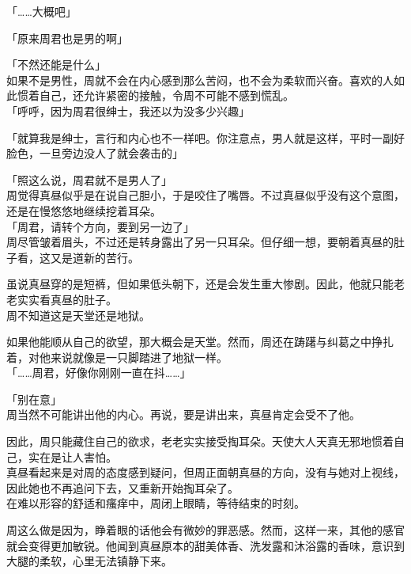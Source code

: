 「……大概吧」

「原来周君也是男的啊」

「不然还能是什么」\\

如果不是男性，周就不会在内心感到那么苦闷，也不会为柔软而兴奋。喜欢的人如此惯着自己，还允许紧密的接触，令周不可能不感到慌乱。\\

「呼呼，因为周君很绅士，我还以为没多少兴趣」

「就算我是绅士，言行和内心也不一样吧。你注意点，男人就是这样，平时一副好脸色，一旦旁边没人了就会袭击的」

「照这么说，周君就不是男人了」\\

周觉得真昼似乎是在说自己胆小，于是咬住了嘴唇。不过真昼似乎没有这个意图，还是在慢悠悠地继续挖着耳朵。\\

「周君，请转个方向，要到另一边了」\\

周尽管皱着眉头，不过还是转身露出了另一只耳朵。但仔细一想，要朝着真昼的肚子看，这又是道新的苦行。

虽说真昼穿的是短裤，但如果低头朝下，还是会发生重大惨剧。因此，他就只能老老实实看真昼的肚子。\\

周不知道这是天堂还是地狱。

如果他能顺从自己的欲望，那大概会是天堂。然而，周还在踌躇与纠葛之中挣扎着，对他来说就像是一只脚踏进了地狱一样。\\

「……周君，好像你刚刚一直在抖……」

「别在意」\\

周当然不可能讲出他的内心。再说，要是讲出来，真昼肯定会受不了他。

因此，周只能藏住自己的欲求，老老实实接受掏耳朵。天使大人天真无邪地惯着自己，实在是让人害怕。\\

真昼看起来是对周的态度感到疑问，但周正面朝真昼的方向，没有与她对上视线，因此她也不再追问下去，又重新开始掏耳朵了。\\

在难以形容的舒适和瘙痒中，周闭上眼睛，等待结束的时刻。

周这么做是因为，睁着眼的话他会有微妙的罪恶感。然而，这样一来，其他的感官就会变得更加敏锐。他闻到真昼原本的甜美体香、洗发露和沐浴露的香味，意识到大腿的柔软，心里无法镇静下来。\\

